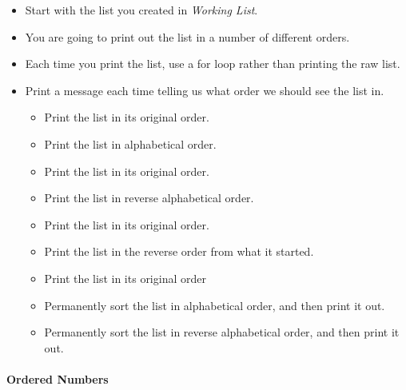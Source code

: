 \documentclass[11pt]{article}
\providecommand{\tightlist}{%
      \setlength{\itemsep}{0pt}\setlength{\parskip}{0pt}}
\begin{document}
\begin{itemize}
\tightlist
\item
  Start with the list you created in \emph{Working List}.
\item
  You are going to print out the list in a number of different orders.
\item
  Each time you print the list, use a for loop rather than printing the
  raw list.
\item
  Print a message each time telling us what order we should see the list
  in.

  \begin{itemize}
  \tightlist
  \item
    Print the list in its original order.
  \item
    Print the list in alphabetical order.
  \item
    Print the list in its original order.
  \item
    Print the list in reverse alphabetical order.
  \item
    Print the list in its original order.
  \item
    Print the list in the reverse order from what it started.
  \item
    Print the list in its original order
  \item
    Permanently sort the list in alphabetical order, and then print it
    out.
  \item
    Permanently sort the list in reverse alphabetical order, and then
    print it out.
  \end{itemize}
\end{itemize}

\hypertarget{ordered-numbers}{%
\paragraph{Ordered Numbers}\label{ordered-numbers}}
\end{document}
